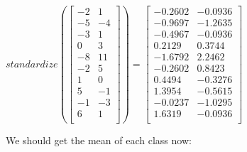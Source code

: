 \documentclass[12pt]{article}
\begin{document}
\begin{center}
    $
    standardize(
    \begin{bmatrix}
        -2 & 1\\
        -5 & -4\\
        -3 & 1\\
        0 & 3\\
        -8 & 11\\
        -2 & 5\\
        1 & 0\\
        5 & -1\\
        -1 & -3\\
        6 & 1\\
    \end{bmatrix}
    )=\begin{bmatrix}
        -0.2602 & -0.0936\\
        -0.9697 & -1.2635\\
        -0.4967 & -0.0936\\
        0.2129 & 0.3744\\
        -1.6792 & 2.2462\\
        -0.2602 & 0.8423\\
        0.4494 & -0.3276\\
        1.3954 & -0.5615\\
        -0.0237 & -1.0295\\
        1.6319 & -0.0936\\
    \end{bmatrix}
    $
    \\[0.1 in]
\end{center}
We should get the mean of each class now:
\end{document}
